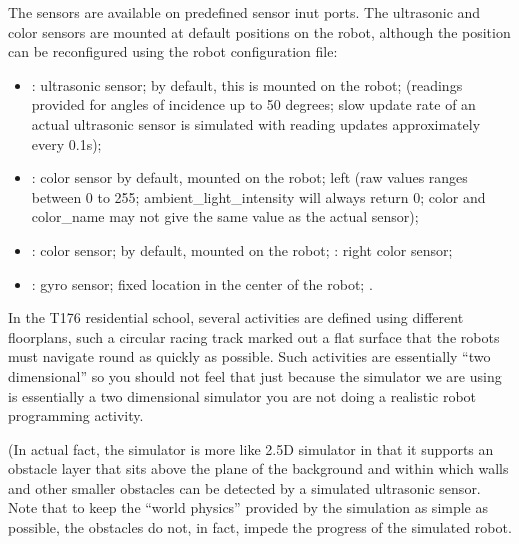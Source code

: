 \documentclass[letterpaper,10pt,english]{sphinxmanual}
\begin{document}
The sensors are available on predefined sensor inut ports. The ultrasonic and color sensors are mounted at default positions on the robot, although the position can be reconfigured using the robot configuration file:
\begin{itemize}
\item {} 
 : ultrasonic sensor; by default, this is mounted  on the robot;  (readings provided for angles of incidence up to 50 degrees; slow update rate of an actual ultrasonic sensor is simulated with reading updates approximately every 0.1s);

\item {} 
 : color sensor by default, mounted  on the robot; left  (raw values ranges between 0 to 255; ambient\_light\_intensity will always return 0; color and color\_name may not give the same value as the actual sensor);

\item {} 
 : color sensor; by default, mounted  on the robot; : right color sensor;

\item {} 
 : gyro sensor; fixed location in the center of the robot; .

\end{itemize}

In the T176 residential school, several activities are defined using different floorplans, such a circular racing track marked out a flat surface that the robots must navigate round as quickly as possible. Such activities are essentially “two dimensional” so you should not feel that just because the simulator we are using is essentially a two dimensional simulator you are not doing a realistic robot programming activity.

(In actual fact, the simulator is more like 2.5D simulator in that it supports an obstacle layer that sits above the plane of the background and within which walls and other smaller obstacles can be detected by a simulated ultrasonic sensor. Note that to keep the “world physics” provided by the simulation as simple as possible, the obstacles do not, in fact, impede the progress of the simulated robot.
\end{document}
